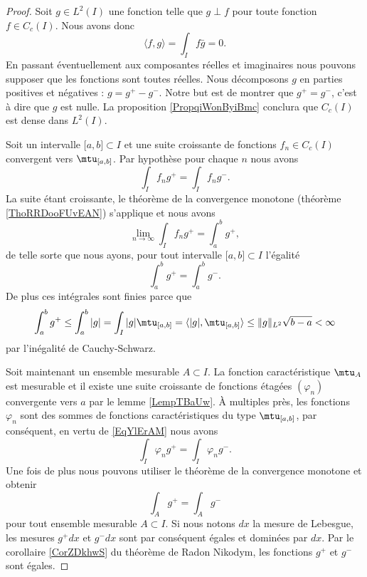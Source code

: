 \begin{proof}
    Soit \( g\in L^2(I)\) une fonction telle que \( g\perp f\) pour toute fonction \( f\in C_c(I)\). Nous avons donc
    \begin{equation}
        \langle f, g\rangle =\int_If\bar g=0.
    \end{equation}
    En passant éventuellement aux composantes réelles et imaginaires nous pouvons supposer que les fonctions sont toutes réelles. Nous décomposons \( g\) en parties positives et négatives : \( g=g^+-g^-\). Notre but est de montrer que \( g^+=g^-\), c'est à dire que \( g\) est nulle. La proposition \ref{PropqiWonByiBmc} conclura que \( C_c(I)\) est dense dans \( L^2(I)\).

    Soit un intervalle \( \mathopen[ a , b \mathclose]\subset I\) et une suite croissante de fonctions \( f_n\in C_c(I)\) convergent vers \( \mtu_{\mathopen[ a , b \mathclose]}\). Par hypothèse pour chaque \( n\) nous avons
    \begin{equation}
        \int_If_ng^+=\int_I f_ng^-.
    \end{equation}
    La suite étant croissante, le théorème de la convergence monotone (théorème \ref{ThoRRDooFUvEAN}) s'applique et nous avons
    \begin{equation}
        \lim_{n\to \infty} \int_I f_ng^+=\int_a^bg^+,
    \end{equation}
    de telle sorte que nous ayons, pour tout intervalle \( \mathopen[ a , b \mathclose]\subset I\) l'égalité
    \begin{equation}        \label{EqYlErAM}
        \int_a^bg^+=\int_a^bg^-.
    \end{equation}
    De plus ces intégrales sont finies parce que
    \begin{equation}
        \int_a^b g^+\leq\int_a^b| g |=\int_I| g |\mtu_{\mathopen[ a , b \mathclose]}=\langle | g |, \mtu_{\mathopen[ a , b \mathclose]}\rangle \leq \| g \|_{L^2}\sqrt{b-a}<\infty
    \end{equation}
    par l'inégalité de Cauchy-Schwarz.

    Soit maintenant un ensemble mesurable \( A\subset I\). La fonction caractéristique \( \mtu_A\) est mesurable et il existe une suite croissante de fonctions étagées \( (\varphi_n)\) convergente vers \( a\) par le lemme \ref{LempTBaUw}. À multiples près, les fonctions \( \varphi_n\) sont des sommes de fonctions caractéristiques du type \( \mtu_{\mathopen[ a , b \mathclose]}\), par conséquent, en vertu de \eqref{EqYlErAM} nous avons
    \begin{equation}
        \int_I\varphi_ng^+=\int_I\varphi_ng^-.
    \end{equation}
    Une fois de plus nous pouvons utiliser le théorème de la convergence monotone et obtenir
    \begin{equation}
        \int_Ag^+=\int_A g^-
    \end{equation}
    pour tout ensemble mesurable \( A\subset I\). Si nous notons \( dx\) la mesure de Lebesgue, les mesures \( g^+dx\) et \( g^-dx\) sont par conséquent égales et dominées par \( dx\). Par le corollaire \ref{CorZDkhwS} du théorème de Radon Nikodym, les fonctions \( g^+\) et \( g^-\) sont égales.
\end{proof}
 
